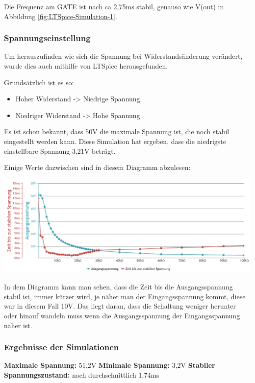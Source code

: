 \documentclass[paper=a4, 12pt]{scrreprt}
\begin{document}
			Die Frequenz am GATE ist nach ca 2,75ms stabil, genauso wie V(out) in Abbildung \ref{fig:LTSpice-Simulation-1}. 
			
			\subsubsection{Spannungseinstellung}
			Um herauszufinden wie sich die Spannung bei Widerstandsänderung verändert, wurde dies auch mithilfe von LTSpice herausgefunden.
			
			Grundsätzlich ist es so:
			\begin{itemize}
				\item Hoher Widerstand -> Niedrige Spannung
				\item Niedriger Widerstand -> Hohe Spannung
			\end{itemize}
			
			Es ist schon bekannt, dass 50V die maximale Spannung ist, die noch stabil eingestellt werden kann. Diese Simulation hat ergeben, dass die niedrigste einstellbare Spannung 3,21V beträgt.
			
			Einige Werte dazwischen sind in diesem Diagramm abzulesen:
			\begin{adjustbox}{center,caption={Spannungsverlauf bei Widerstandsänderung},label={fig:spgVLbWdst},nofloat=figure,vspace=\bigskipamount}
				\includegraphics[width=\textwidth]{img/simulationSPG.PNG}
			\end{adjustbox}
		
			In dem Diagramm kann man sehen, dass die Zeit bis die Ausgangsspannung stabil ist, immer kürzer wird, je näher man der Eingangsspannung kommt, diese war in diesem Fall 10V. Das liegt daran, dass die Schaltung weniger herunter oder hinauf wandeln muss wenn die Ausgangsspannung der Eingangsspannung näher ist.
		
			\subsubsection{Ergebnisse der Simulationen}
			{\large \textbf{Maximale Spannung:} 51,2V} \hfill \break
			{\large \textbf{Minimale Spannung:} 3,2V}\hfill \break
			{\large \textbf{Stabiler Spannungszustand:} nach durchschnittlich 1,74ms} \hfill \break
			\newpage
			
\end{document}
